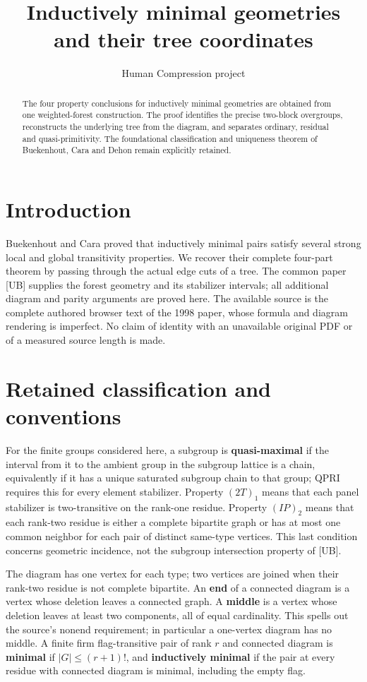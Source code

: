 
\title{Inductively minimal geometries and their tree coordinates}
\author{Human Compression project}
\date{}

\maketitle
\begin{abstract}
The four property conclusions for inductively minimal geometries are obtained from one weighted-forest construction. The proof identifies the precise two-block overgroups, reconstructs the underlying tree from the diagram, and separates ordinary, residual and quasi-primitivity. The foundational classification and uniqueness theorem of Buekenhout, Cara and Dehon remain explicitly retained.
\end{abstract}
\section{Introduction}
Buekenhout and Cara proved that inductively minimal pairs satisfy several strong local and global transitivity properties. We recover their complete four-part theorem by passing through the actual edge cuts of a tree. The common paper [UB] supplies the forest geometry and its stabilizer intervals; all additional diagram and parity arguments are proved here. The available source is the complete authored browser text of the 1998 paper, whose formula and diagram rendering is imperfect. No claim of identity with an unavailable original PDF or of a measured source length is made.
\section{Retained classification and conventions}
For the finite groups considered here, a subgroup is \textbf{quasi-maximal} if the interval from it to the ambient group in the subgroup lattice is a chain, equivalently if it has a unique saturated subgroup chain to that group; QPRI requires this for every element stabilizer. Property \((2T)_1\) means that each panel stabilizer is two-transitive on the rank-one residue. Property \((IP)_2\) means that each rank-two residue is either a complete bipartite graph or has at most one common neighbor for each pair of distinct same-type vertices. This last condition concerns geometric incidence, not the subgroup intersection property of [UB].

The diagram has one vertex for each type; two vertices are joined when their rank-two residue is not complete bipartite. An \textbf{end} of a connected diagram is a vertex whose deletion leaves a connected graph. A \textbf{middle} is a vertex whose deletion leaves at least two components, all of equal cardinality. This spells out the source's nonend requirement; in particular a one-vertex diagram has no middle. A finite firm flag-transitive pair of rank \(r\) and connected diagram is \textbf{minimal} if \(|G|\leq(r+1)!\), and \textbf{inductively minimal} if the pair at every residue with connected diagram is minimal, including the empty flag.

